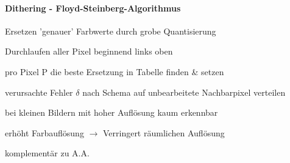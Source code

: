\documentclass[landscape]{article}
\begin{document}
\begin{multicols}{3}
  \paragraph{Dithering - Floyd-Steinberg-Algorithmus}
  \begin{itemize*}
    \item Ersetzen 'genauer' Farbwerte durch grobe Quantisierung
    \item Durchlaufen aller Pixel beginnend links oben
    \item pro Pixel P die beste Ersetzung in Tabelle finden \& setzen
    \item verursachte Fehler $\delta$ nach Schema auf unbearbeitete Nachbarpixel verteilen
    \item bei kleinen Bildern mit hoher Auflösung kaum erkennbar
    \item erhöht Farbauflösung $\rightarrow$ Verringert räumlichen Auflösung
    \item komplementär zu A.A.
  \end{itemize*}
  
\end{multicols}
\newpage
\end{document}
